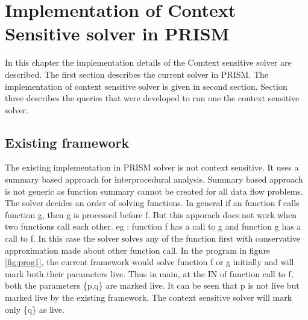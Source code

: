 \documentclass[12pt]{report}
\begin{document}
\newpage
\chapter{Implementation of Context Sensitive solver in PRISM}

In this chapter the implementation details of the Comtext sensitive solver are described. The first section describes the current solver in PRISM. The implementation of context sensitive solver is given in second section. Section three describes the queries that were developed to run one the context sensitive solver.

\section{Existing framework}

The existing implementation in PRISM solver is not context sensitive. It uses a summary based approach for interprocedural analysis. Summary based approach is not generic as function summary cannot be created for all data flow problems. The solver decides an order of solving functions. In general if an function f calls function g, then g is processed before f. But this apporach does not work when two functions call each other. eg : function f has a call to g and function g has a call to f. In this case the solver solves any of the function first with conservative approximation made about other function call. In the program in figure \ref{fig:prog1}, the current framework would solve function f or g initially and will mark both their parameters live. Thus in main, at the IN of function call to f, both the parameters \{p,q\} are marked live. It can be seen that p is not live but marked live by the existing framework. The context sensitive solver will mark only \{q\} as live.
\end{document}
